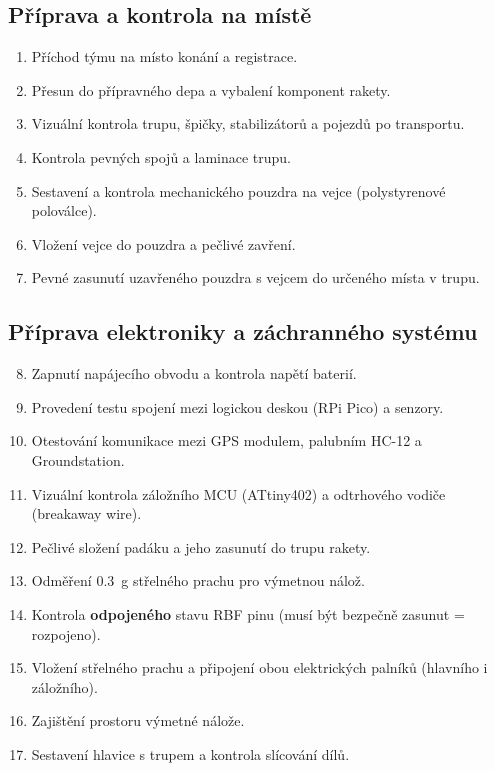 \documentclass[a4paper,12pt]{article}
\begin{document}
\subsection*{Příprava a kontrola na místě}
\begin{enumerate}
    \item Příchod týmu na místo konání a registrace.
    \item Přesun do přípravného depa a vybalení komponent rakety.
    \item Vizuální kontrola trupu, špičky, stabilizátorů a pojezdů po transportu.
    \item Kontrola pevných spojů a laminace trupu.
    \item Sestavení a kontrola mechanického pouzdra na vejce (polystyrenové poloválce).
    \item Vložení vejce do pouzdra a pečlivé zavření.
    \item Pevné zasunutí uzavřeného pouzdra s vejcem do určeného místa v trupu.
\end{enumerate}

\subsection*{Příprava elektroniky a záchranného systému}
\begin{enumerate}
    \setcounter{enumi}{7}
    \item Zapnutí napájecího obvodu a kontrola napětí baterií.
    \item Provedení testu spojení mezi logickou deskou (RPi Pico) a senzory.
    \item Otestování komunikace mezi GPS modulem, palubním HC-12 a Groundstation.
    \item Vizuální kontrola záložního MCU (ATtiny402) a odtrhového vodiče (breakaway wire).
    \item Pečlivé složení padáku a jeho zasunutí do trupu rakety.
    \item Odměření 0.3~g střelného prachu pro výmetnou nálož.
    \item Kontrola \textbf{odpojeného} stavu RBF pinu (musí být bezpečně zasunut = rozpojeno).
    \item Vložení střelného prachu a připojení obou elektrických palníků (hlavního i záložního).
    \item Zajištění prostoru výmetné nálože.
    \item Sestavení hlavice s trupem a kontrola slícování dílů.
\end{enumerate}
\end{document}
